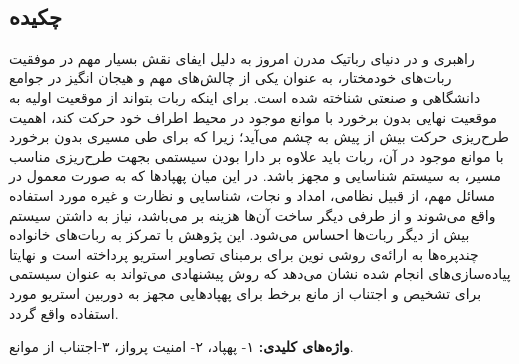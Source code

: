 
\setcounter{page}{1}
\thispagestyle{empty}

~\vfill

\subsection*{چکیده}
\begin{small}
\baselineskip=0.7cm
راهبری و  در دنیای رباتیک مدرن امروز به دلیل ایفای نقش بسیار مهم در موفقیت ربات‌های خودمختار، به عنوان یکی از چالش‌های مهم و هیجان انگیز در جوامع دانشگاهی و صنعتی شناخته شده است. برای اینکه ربات بتواند از موقعیت اولیه به موقعیت نهایی بدون برخورد با موانع موجود در محیط اطراف خود حرکت کند، اهمیت طرح‌ریزی حرکت بیش از پیش به چشم می‌آید؛ زیرا که برای طی مسیری بدون برخورد با موانع موجود در آن، ربات باید علاوه بر دارا بودن سیستمی بجهت طرح‌ریزی مناسب مسیر، به سیستم شناسایی و  مجهز باشد. در این میان پهپادها که به صورت معمول در مسائل مهم، از قبیل نظامی، امداد و نجات، شناسایی و نظارت و غیره مورد استفاده واقع می‌شوند و از طرفی دیگر ساخت آن‌ها هزینه بر می‌باشد، نیاز به داشتن سیستم‌  بیش از دیگر ربات‌ها احساس می‌شود. این پژوهش با تمرکز به ربات‌های خانواده چندپره‌ها به ارائه‌ی روشی نوین برای  برمبنای تصاویر استریو پرداخته است و نهایتا پیاده‌سازی‌های انجام شده نشان می‌دهد که روش پیشنهادی می‌تواند به عنوان سیستمی برای تشخیص و اجتناب از مانع برخط برای پهپادهایی مجهز به دوربین استریو مورد استفاده واقع گردد.
\vspace*{0.5 cm}

\noindent\textbf{واژه‌های کلیدی:}
۱- پهپاد، ۲- امنیت پرواز، ۳-اجتناب از موانع.
\end{small}